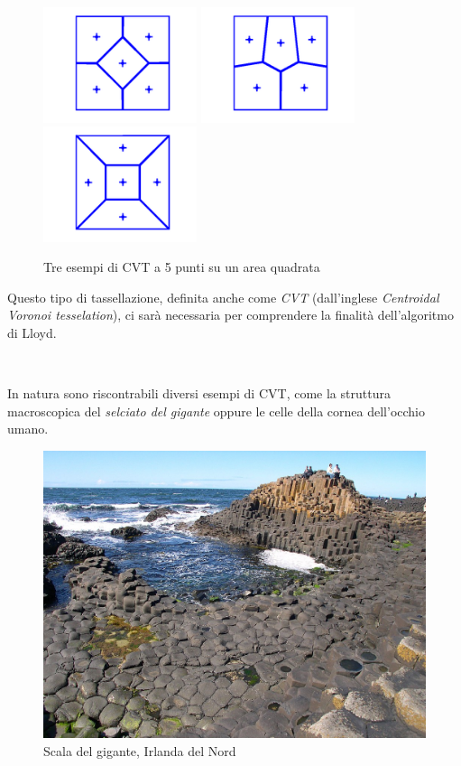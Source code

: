 \documentclass[11pt,a4paper]{report}
\begin{document}
\begin{figure}[H]
	\centering
	\includegraphics[width=4.5cm]{cvt1.png}
	\includegraphics[width=4.5cm]{cvt2.png}
	\includegraphics[width=4.5cm]{cvt3.png}
	\caption{Tre esempi di CVT a 5 punti su un area quadrata}
\end{figure}

Questo tipo di tassellazione, definita anche come \textit{CVT} (dall'inglese \textit{Centroidal Voronoi tesselation}), ci sarà necessaria per comprendere la finalità dell'algoritmo di Lloyd.

\

In natura sono riscontrabili diversi esempi di CVT, come la struttura macroscopica del \textit{selciato del gigante} oppure le celle della cornea dell'occhio umano.

\begin{figure}[H]
\centering
\includegraphics[width=14cm]{selciato_del_gigante.jpg}
\caption{Scala del gigante, Irlanda del Nord}
\end{figure}
\end{document}
